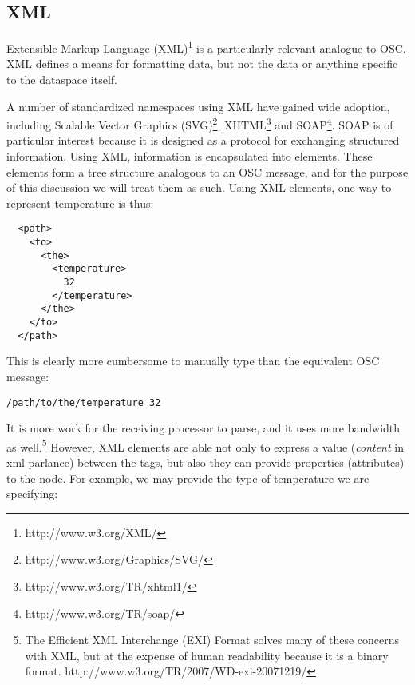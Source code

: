 \documentclass{NIME-alternate}
\begin{document}

\subsection{XML}
\label{sub:xml}

Extensible Markup Language (XML)\footnote{http://www.w3.org/XML/} is a particularly relevant analogue to OSC.  XML defines a means for formatting data, but not the data or anything specific to the dataspace itself.


A number of standardized namespaces using XML have gained wide adoption, including Scalable Vector Graphics (SVG)\footnote{http://www.w3.org/Graphics/SVG/}, XHTML\footnote{http://www.w3.org/TR/xhtml1/} and SOAP\footnote{http://www.w3.org/TR/soap/}.  SOAP is of particular interest because it is designed as a protocol for exchanging structured information.
Using XML, information is encapsulated into elements.  These elements form a tree structure analogous to an OSC message, and for the purpose of this discussion we will treat them as such.  Using XML elements, one way to represent temperature is thus:
\begin{lstlisting}
  <path>
    <to>
      <the>
        <temperature> 
          32
        </temperature>
      </the>
    </to>
  </path>
\end{lstlisting}

This is clearly more cumbersome to manually type than the equivalent OSC message:

\noindent
\texttt{/path/to/the/temperature 32}

It is more work for the receiving processor to parse, and it uses more bandwidth as well.\footnote{The Efficient XML Interchange (EXI) Format solves many of these concerns with XML, but at the expense of human readability because it is a binary format.  http://www.w3.org/TR/2007/WD-exi-20071219/} However, XML elements are able not only to express a value (\emph{content} in xml parlance) between the tags, but also they can provide properties (attributes) to the node. For example, we may provide the type of temperature we are specifying:
\end{document}
